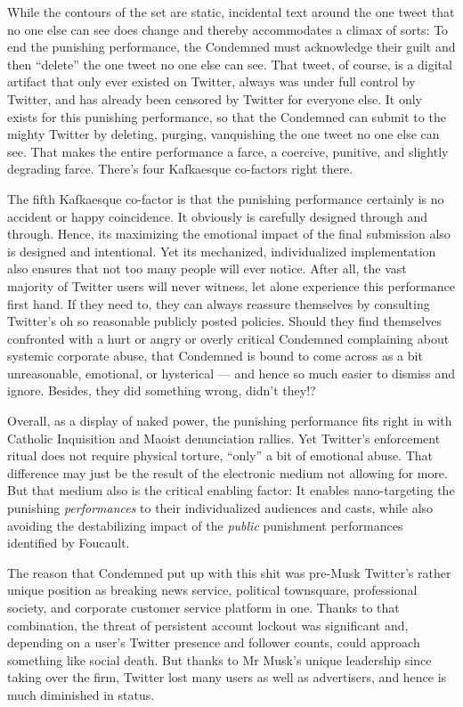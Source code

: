 While the contours of the set are static, incidental text around the one tweet
that no one else can see does change and thereby accommodates a climax of sorts:
To end the punishing performance, the Condemned must acknowledge their guilt and
then ``delete'' the one tweet no one else can see. That tweet, of course, is a
digital artifact that only ever existed on Twitter, always was under full
control by Twitter, and has already been censored by Twitter for everyone else.
It only exists for this punishing performance, so that the Condemned can submit
to the mighty Twitter by deleting, purging, vanquishing the one tweet no one
else can see. That makes the entire performance a farce, a coercive, punitive,
and slightly degrading farce. There's four Kafkaesque co-factors right there.

The fifth Kafkaesque co-factor is that the punishing performance certainly is no
accident or happy coincidence. It obviously is carefully designed through and
through. Hence, its maximizing the emotional impact of the final submission also
is designed and intentional. Yet its mechanized, individualized implementation
also ensures that not too many people will ever notice. After all, the vast
majority of Twitter users will never witness, let alone experience this
performance first hand. If they need to, they can always reassure themselves by
consulting Twitter's oh so reasonable publicly posted policies. Should they find
themselves confronted with a hurt or angry or overly critical Condemned
complaining about systemic corporate abuse, that Condemned is bound to come
across as a bit unreasonable, emotional, or hysterical — and hence so much
easier to dismiss and ignore. Besides, they did something wrong, didn't they!?

Overall, as a display of naked power, the punishing performance fits right in
with Catholic Inquisition and Maoist denunciation rallies. Yet Twitter's
enforcement ritual does not require physical torture, ``only'' a bit of
emotional abuse. That difference may just be the result of the electronic medium
not allowing for more. But that medium also is the critical enabling factor: It
enables nano-targeting the punishing \emph{performances} to their individualized
audiences and casts, while also avoiding the destabilizing impact of the
\emph{public} punishment performances identified by Foucault.

The reason that Condemned put up with this shit was pre-Musk Twitter's rather
unique position as breaking news service, political townsquare, professional
society, and corporate customer service platform in one. Thanks to that
combination, the threat of persistent account lockout was significant and,
depending on a user's Twitter presence and follower counts, could approach
something like social death. But thanks to Mr Musk's unique leadership since
taking over the firm, Twitter lost many users as well as advertisers, and hence
is much diminished in status.


